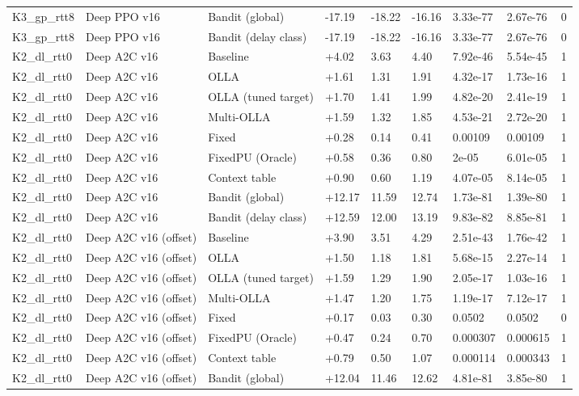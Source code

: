 \documentclass[10pt]{article}
\begin{document}
\begin{landscape}
\begin{longtable}{@{}lllllllll@{}}
K3\_gp\_rtt8 & Deep PPO v16 & Bandit (global) & -17.19 & -18.22 & -16.16 & 3.33e-77 & 2.67e-76 & 0 \\
K3\_gp\_rtt8 & Deep PPO v16 & Bandit (delay class) & -17.19 & -18.22 & -16.16 & 3.33e-77 & 2.67e-76 & 0 \\
K2\_dl\_rtt0 & Deep A2C v16 & Baseline & +4.02 & 3.63 & 4.40 & 7.92e-46 & 5.54e-45 & 1 \\
K2\_dl\_rtt0 & Deep A2C v16 & OLLA & +1.61 & 1.31 & 1.91 & 4.32e-17 & 1.73e-16 & 1 \\
K2\_dl\_rtt0 & Deep A2C v16 & OLLA (tuned target) & +1.70 & 1.41 & 1.99 & 4.82e-20 & 2.41e-19 & 1 \\
K2\_dl\_rtt0 & Deep A2C v16 & Multi-OLLA & +1.59 & 1.32 & 1.85 & 4.53e-21 & 2.72e-20 & 1 \\
K2\_dl\_rtt0 & Deep A2C v16 & Fixed & +0.28 & 0.14 & 0.41 & 0.00109 & 0.00109 & 1 \\
K2\_dl\_rtt0 & Deep A2C v16 & FixedPU (Oracle) & +0.58 & 0.36 & 0.80 & 2e-05 & 6.01e-05 & 1 \\
K2\_dl\_rtt0 & Deep A2C v16 & Context table & +0.90 & 0.60 & 1.19 & 4.07e-05 & 8.14e-05 & 1 \\
K2\_dl\_rtt0 & Deep A2C v16 & Bandit (global) & +12.17 & 11.59 & 12.74 & 1.73e-81 & 1.39e-80 & 1 \\
K2\_dl\_rtt0 & Deep A2C v16 & Bandit (delay class) & +12.59 & 12.00 & 13.19 & 9.83e-82 & 8.85e-81 & 1 \\
K2\_dl\_rtt0 & Deep A2C v16 (offset) & Baseline & +3.90 & 3.51 & 4.29 & 2.51e-43 & 1.76e-42 & 1 \\
K2\_dl\_rtt0 & Deep A2C v16 (offset) & OLLA & +1.50 & 1.18 & 1.81 & 5.68e-15 & 2.27e-14 & 1 \\
K2\_dl\_rtt0 & Deep A2C v16 (offset) & OLLA (tuned target) & +1.59 & 1.29 & 1.90 & 2.05e-17 & 1.03e-16 & 1 \\
K2\_dl\_rtt0 & Deep A2C v16 (offset) & Multi-OLLA & +1.47 & 1.20 & 1.75 & 1.19e-17 & 7.12e-17 & 1 \\
K2\_dl\_rtt0 & Deep A2C v16 (offset) & Fixed & +0.17 & 0.03 & 0.30 & 0.0502 & 0.0502 & 0 \\
K2\_dl\_rtt0 & Deep A2C v16 (offset) & FixedPU (Oracle) & +0.47 & 0.24 & 0.70 & 0.000307 & 0.000615 & 1 \\
K2\_dl\_rtt0 & Deep A2C v16 (offset) & Context table & +0.79 & 0.50 & 1.07 & 0.000114 & 0.000343 & 1 \\
K2\_dl\_rtt0 & Deep A2C v16 (offset) & Bandit (global) & +12.04 & 11.46 & 12.62 & 4.81e-81 & 3.85e-80 & 1 \\

\end{longtable}
\end{landscape}
\end{document}
